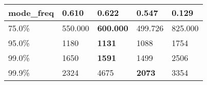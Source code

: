 \begin{table}[H]
\begin{tabular}{|l|m{10em}|m{10em}|m{10em}|m{10em}|}
\hline mode\_freq & 0.610 & \bfseries 0.622 & 0.547 & \cellcolor[rgb]{0.9, 0.54, 0.52} 0.129 \\
\hline 75.0\% & 550.000 & \bfseries 600.000 & 499.726 & \cellcolor[rgb]{0.9, 0.54, 0.52} 825.000 \\
\hline 95.0\% & 1180 & \bfseries 1131 & 1088 & \cellcolor[rgb]{0.9, 0.54, 0.52} 1754 \\
\hline 99.0\% & 1650 & \bfseries 1591 & 1499 & \cellcolor[rgb]{0.9, 0.54, 0.52} 2506 \\
\hline 99.9\% & 2324 & \cellcolor[rgb]{0.9, 0.54, 0.52} 4675 & \bfseries 2073 & 3354 \\
\hline
\end{tabular}
\end{table}
